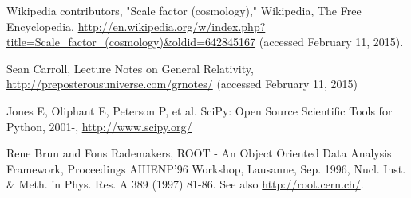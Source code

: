 \documentclass[aps,reprint,prl]{revtex4-1}
\begin{document}
\begin{thebibliography}{99}

Wikipedia contributors, "Scale factor (cosmology)," Wikipedia, The Free Encyclopedia, \url{http://en.wikipedia.org/w/index.php?title=Scale_factor_(cosmology)&oldid=642845167} (accessed February 11, 2015).

Sean Carroll, Lecture Notes on General Relativity, \url{http://preposterousuniverse.com/grnotes/} (accessed February 11, 2015)

Jones E, Oliphant E, Peterson P, et al. SciPy: Open Source Scientific Tools for Python, 2001-, \url{http://www.scipy.org/} 

Rene Brun and Fons Rademakers, ROOT - An Object Oriented Data Analysis Framework, Proceedings AIHENP'96 Workshop, Lausanne, Sep. 1996, Nucl. Inst. \& Meth. in Phys. Res. A 389 (1997) 81-86. See also \url{http://root.cern.ch/}.

\end{thebibliography}
\end{document}
